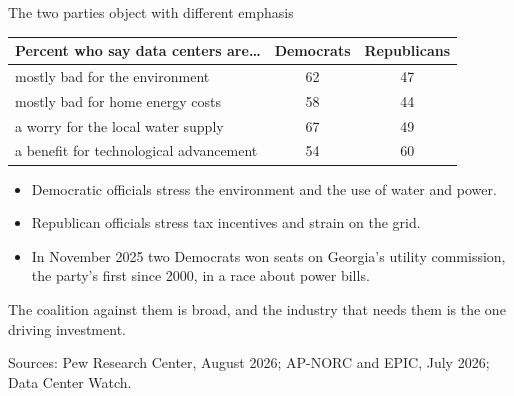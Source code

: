 \documentclass[aspectratio=169,11pt]{beamer}
\begin{document}
\begin{frame}{The two parties object with different emphasis}

\begin{center}
\footnotesize
\begin{tabular}{@{}lcc@{}}
\toprule
\textbf{Percent who say data centers are\ldots} & \textbf{Democrats} & \textbf{Republicans} \\
\midrule
mostly bad for the environment & 62 & 47 \\
mostly bad for home energy costs & 58 & 44 \\
a worry for the local water supply & 67 & 49 \\
a benefit for technological advancement & 54 & 60 \\
\bottomrule
\end{tabular}
\end{center}

\vspace{0.15cm}

\begin{itemize}\setlength\itemsep{0.15em}
    \item Democratic officials stress the environment and the use of water and power.
    \item Republican officials stress tax incentives and strain on the grid.
    \item In November 2025 two Democrats won seats on Georgia's utility commission, the party's first since 2000, in a race about power bills.
\end{itemize}

\vspace{0.15cm}

\alert{The coalition against them is broad, and the industry that needs them is the one driving investment.}

\vspace{0.1cm}
{\scriptsize\color{warmgray}Sources: Pew Research Center, August 2026; AP-NORC and EPIC, July 2026; Data Center Watch.}

\end{frame}

\end{document}

